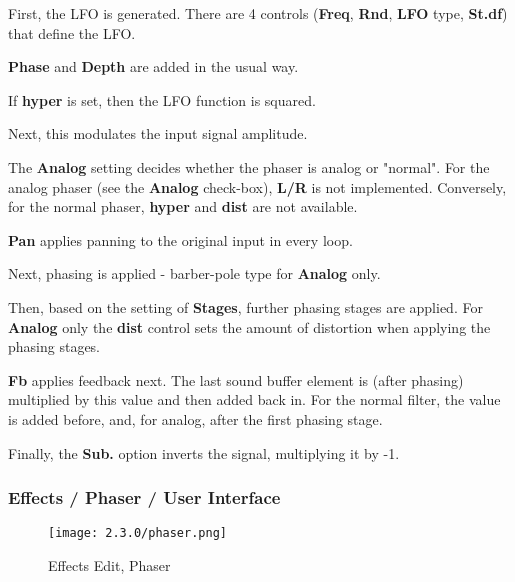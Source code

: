    \begin{enumber}
      \item First, the LFO is generated.
         There are 4 controls
         (\textbf{Freq}, \textbf{Rnd}, \textbf{LFO} type, \textbf{St.df})
         that define the LFO.
      \item \textbf{Phase} and \textbf{Depth} are added in the usual way.
      \item If \textbf{hyper} is set, then the LFO function is squared.
      \item Next, this modulates the input signal amplitude.
      \item The \textbf{Analog} setting decides whether the phaser is analog
            or "normal".
            For the analog phaser (see the \textbf{Analog} check-box),
            \textbf{L/R} is not implemented.
            Conversely, for the normal phaser, \textbf{hyper} and \textbf{dist}
            are not available.
      \item \textbf{Pan} applies panning to the original input in every loop.
      \item Next, phasing is applied - barber-pole type for \textbf{Analog} only.
      \item Then, based on the setting of \textbf{Stages}, further phasing
            stages are applied.
            For \textbf{Analog} only the \textbf{dist} control sets the amount of
            distortion when applying the phasing stages.
      \item \textbf{Fb} applies feedback next. The last sound buffer element is (after
            phasing) multiplied by this value and then added back in. For the
            normal filter, the value is added before, and, for analog, after the
            first phasing stage.
      \item Finally, the \textbf{Sub.} option inverts the signal, multiplying it
            by -1.
   \end{enumber}

\subsubsection{Effects / Phaser / User Interface}
\label{subsubsec:effects_edit_phaser_ui}

\begin{figure}[H]
   \centering
   \texttt{[image: 2.3.0/phaser.png]}
   \caption{Effects Edit, Phaser}
   \label{fig:effects_edit_phaser}
\end{figure}

